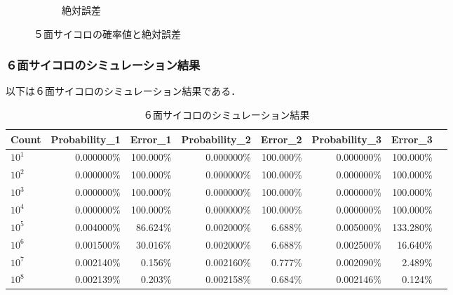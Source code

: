 \documentclass[a4j, titlepage]{jarticle}
\begin{document}
\begin{figure}[htb]
\begin{subfigure}[b]{0.38\textwidth}
            \caption{絶対誤差}
            \label{fig:errdic5}
          \end{subfigure}
          \hfill
              \caption{５面サイコロの確率値と絶対誤差}
             \label{fig:resdic5}
        \end{figure}
      
      \subsubsection{６面サイコロのシミュレーション結果}
        以下は６面サイコロのシミュレーション結果である．

        \begin{longtable}[c]{|l|r|r|r|r|r|r|r|}
          \caption{６面サイコロのシミュレーション結果}
          \label{tab:dice6}\\
          \hline
          \rowcolor[HTML]{C0C0C0} 
          Count    & Probability\_1 & Error\_1 & Probability\_2 & Error\_2 & Probability\_3 & Error\_3 \\ \hline
          \endfirsthead
          \endhead
          $10^1$    & 0.000000\%     & 100.000\%        & 0.000000\%     & 100.000\%        & 0.000000\%     & 100.000\%        \\ \hline
          $10^2$    & 0.000000\%     & 100.000\%        & 0.000000\%     & 100.000\%        & 0.000000\%     & 100.000\%        \\ \hline
          $10^3$    & 0.000000\%     & 100.000\%        & 0.000000\%     & 100.000\%        & 0.000000\%     & 100.000\%        \\ \hline
          $10^4$    & 0.000000\%     & 100.000\%        & 0.000000\%     & 100.000\%        & 0.000000\%     & 100.000\%        \\ \hline
          $10^5$    & 0.004000\%     & 86.624\%         & 0.002000\%     & 6.688\%          & 0.005000\%     & 133.280\%        \\ \hline
          $10^6$    & 0.001500\%     & \cellcolor[HTML]{FD6864}30.016\%         & 0.002000\%     & \cellcolor[HTML]{FD6864}6.688\%          & 0.002500\%     & \cellcolor[HTML]{FD6864}16.640\%         \\ \hline
          $10^7$    & 0.002140\%     & 0.156\%          & 0.002160\%     & 0.777\%          & 0.002090\%     & 2.489\%          \\ \hline
          $10^8$    & 0.002139\%     & 0.203\%          & 0.002158\%     & 0.684\%          & 0.002146\%     & 0.124\%          \\ \hline
        \end{longtable}
\end{document}
